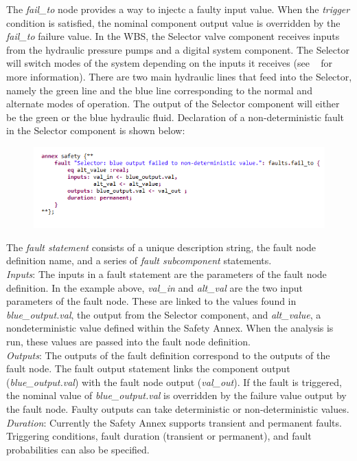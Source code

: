 The \textit{fail\_to} node provides a way to injectc a faulty input value. When the \textit{trigger} condition is satisfied, the nominal component output value is overridden by the \textit{fail\_to} failure value. In the WBS, the Selector valve component receives inputs from the hydraulic pressure pumps and a digital system component. The Selector will switch modes of the system depending on the inputs it receives (see ~\cite{AIR6110,Stewart17:IMBSA} for more information). There are two main hydraulic lines that feed into the Selector, namely the green line and the blue line corresponding to the normal and alternate modes of operation. The output of the Selector component will either be the green or the blue hydraulic fluid. Declaration of a non-deterministic fault in the Selector component is shown below:
\begin{figure}[h!]
\vspace{-0.17in}
\begin{center}
\includegraphics[trim=0 15 0 11,clip,width=1.0\textwidth]{images/annex.png}
\end{center}
\vspace{-0.40in}
\end{figure}

The \textit{fault statement} consists of a unique description string, the fault node definition name, and a series of \textit{fault subcomponent} statements. \\
\textit{Inputs}: The inputs in a fault statement are the parameters of the fault node definition. In the example above, \textit{val\_in} and \textit{alt\_val} are the two input parameters of the fault node. These are linked to the values found in \textit{blue\_output.val}, the output from the Selector component, and \textit{alt\_value}, a nondeterministic value defined within the Safety Annex. When the analysis is run, these values are passed into the fault node definition.\\
\textit{Outputs}: The outputs of the fault definition correspond to the outputs of the fault node. The fault output statement links the component output (\textit{blue\_output.val}) with the fault node output (\textit{val\_out}). If the fault is triggered, the nominal value of \textit{blue\_output.val} is overridden by the failure value output by the fault node. Faulty outputs can take deterministic or non-deterministic values. \\
\textit{Duration}: Currently the Safety Annex supports transient and permanent faults.\\
Triggering conditions, fault duration (transient or permanent), and fault probabilities can also be specified.





